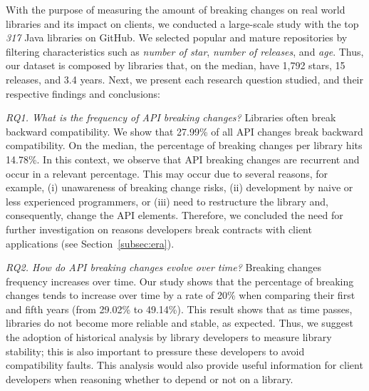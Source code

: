 \documentclass[11pt, a4paper]{article}
\begin{document}
With the purpose of measuring the amount of breaking changes on real world libraries and its impact on clients, we conducted a large-scale study with the top \emph{317} Java libraries on GitHub.
We selected popular and mature repositories by filtering characteristics such as \emph{number of star}, \emph{number of releases}, and \emph{age}.
Thus, our dataset is composed by libraries that, on the median, have 1,792 stars, 15 releases, and 3.4 years.
Next, we present each research question studied, and their respective findings and conclusions:

\vspace{0.2cm}

\noindent\emph{RQ1. What is the frequency of API breaking changes?} 
Libraries often break backward compatibility.
We show that 27.99\% of all API changes break backward compatibility.
On the median, the percentage of breaking changes per library hits 14.78\%.
In this context, we observe that API breaking changes are recurrent and occur in a relevant percentage.
This may occur due to several reasons, for example, 
(i) unawareness of breaking change risks,
(ii) development by naive or less experienced programmers, or
(iii) need to restructure the library and, consequently, change the API elements.
Therefore, we concluded the need for further investigation on reasons developers break contracts with client applications (see Section~\ref{subsec:era}). %

\vspace{0.2cm}

\noindent\emph{RQ2. How do API breaking changes evolve over time?} 
Breaking changes frequency increases over time.
Our study shows that the percentage of breaking changes tends to increase over time by a rate of 20\% when comparing their first and fifth years (from 29.02\% to 49.14\%). 
This result shows that as time passes, libraries do not become more reliable and stable, as expected.
Thus, we suggest the adoption of historical analysis by library developers to measure library stability; this is also important to pressure these developers to avoid compatibility faults.
This analysis would also provide useful information for client developers when reasoning whether to depend or not on a library. 

\vspace{0.2cm}
\end{document}
